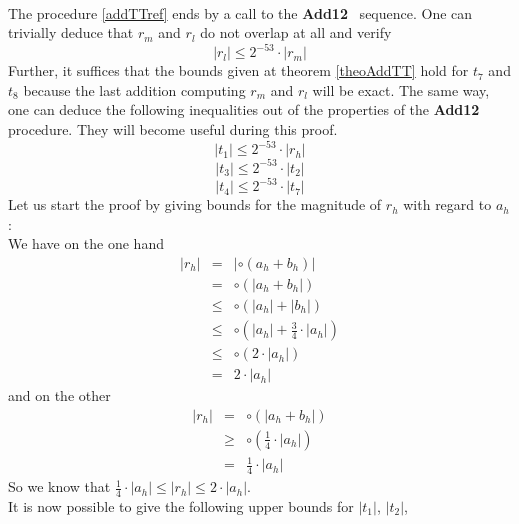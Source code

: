 \documentclass[a4paper,10pt,twoside]{article}
\newenvironment{proof}[1][Proof]{\begin{trivlist}
\item[\hskip \labelsep {\bfseries #1}]}{\end{trivlist}}
\newcommand{\hi}{\ensuremath{\mathit{h}}}
\newcommand{\mi}{\ensuremath{\mathit{m}}}
\newcommand{\lo}{\ensuremath{\mathit{l}}}
\newcommand{\Add}{{\bf Add12}}
\begin{document}
\begin{proof} ~ \\
The procedure \ref{addTTref} ends by a call to the \Add~ sequence. One can
trivially deduce that $r_\mi$ and $r_\lo$ do not overlap at all and verify
$$\left \vert r_\lo \right \vert \leq 2^{-53} \cdot \left \vert r_\mi \right \vert$$
Further, it suffices that the bounds given at theorem \ref{theoAddTT} hold for
$t_7$ and $t_8$ because
the last addition computing $r_\mi$ and $r_\lo$ will be exact.
The same way, one can deduce the following inequalities out of the properties
of the \Add~ procedure. They will become useful during this proof.
$$\left \vert t_1 \right \vert \leq 2^{-53} \cdot \left \vert r_\hi \right \vert$$
$$\left \vert t_3 \right \vert \leq 2^{-53} \cdot \left \vert t_2 \right \vert$$
$$\left \vert t_4 \right \vert \leq 2^{-53} \cdot \left \vert t_7 \right \vert$$
Let us start the proof by giving bounds for the magnitude of $r_\hi$ with
regard to $a_\hi$:\\
We have on the one hand
\begin{eqnarray*}
\left \vert r_\hi \right \vert & = & \left \vert \circ\left( a_\hi + b_\hi \right) \right \vert \\
& = & \circ \left( \left \vert a_\hi + b_\hi \right \vert \right) \\
& \leq & \circ \left( \left \vert a_\hi \right \vert + \left \vert b_\hi \right \vert \right) \\
& \leq & \circ \left( \left \vert a_\hi \right \vert + \frac{3}{4} \cdot \left \vert a_\hi \right \vert \right) \\
& \leq & \circ \left( 2 \cdot \left \vert a_\hi \right \vert \right) \\
& = & 2 \cdot \left \vert a_\hi \right \vert
\end{eqnarray*}
and on the other
\begin{eqnarray*}
\left \vert r_\hi \right \vert & = & \circ \left( \left \vert a_\hi + b_\hi \right \vert \right) \\
& \geq & \circ \left( \frac{1}{4} \cdot \left \vert a_\hi \right \vert \right) \\
& = & \frac{1}{4} \cdot \left \vert a_\hi \right \vert
\end{eqnarray*}
So we know that $\frac{1}{4} \cdot \left \vert a_\hi \right \vert \leq \left \vert r_\hi \right \vert \leq 2 \cdot \left \vert a_\hi \right \vert$.\\
It is now possible to give the following upper bounds for
$\left \vert t_1 \right \vert$, $\left \vert t_2 \right \vert$,

\end{proof}
\end{document}
